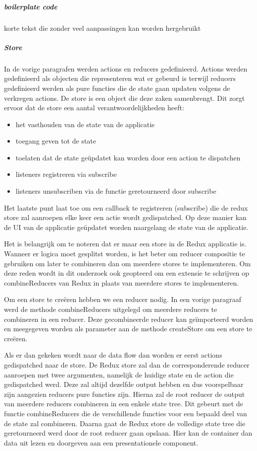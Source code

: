 \subparagraph{boilerplate code}
korte tekst die zonder veel aanpassingen kan worden hergebruikt

\subparagraph{Store}
In de vorige paragrafen werden actions en reducers gedefinieerd. Actions werden gedefinieerd als objecten die representeren wat er gebeurd is terwijl reducers gedefinieerd werden als pure functies die de state gaan updaten volgens de verkregen actions. De store is een object die deze zaken samenbrengt. Dit zorgt ervoor dat de store een aantal verantwoordelijkheden heeft:

\begin{itemize}
	\item het vasthouden van de state van de applicatie
	\item toegang geven tot de state
	\item toelaten dat de state geüpdatet kan worden door een action te dispatchen
	\item listeners registreren via subscribe
	\item listeners unsubscriben via de functie geretourneerd door subscribe
\end{itemize}

Het laatste punt laat toe om een callback te registreren (subscribe) die de redux store zal aanroepen elke keer een actie wordt gedispatched. Op deze manier kan de UI van de applicatie geüpdatet worden naargelang de state van de applicatie. 

Het is belangrijk om te noteren dat er maar een store in de Redux applicatie is. Wanneer er logica moet gesplitst worden, is het beter om reducer compositie te gebruiken om later te combineren dan om meerdere stores te implementeren. Om deze reden wordt in dit onderzoek ook geopteerd om een extensie te schrijven op combineReducers van Redux in plaats van meerdere stores te implementeren.

Om een store te creëren hebben we een reducer nodig. In een vorige paragraaf werd de methode combineReducers uitgelegd om meerdere reducers te combineren in een reducer. Deze gecombineerde reducer kan geïmporteerd worden en meegegeven worden als parameter aan de methode createStore om een store te creëren.

Als er dan gekeken wordt naar de data flow dan worden er eerst actions gedispatched naar de store. De Redux store zal dan de corresponderende reducer aanroepen met twee argumenten, namelijk de huidige state en de action die gedispatched werd. Deze zal altijd dezelfde output hebben en dus voorspelbaar zijn aangezien reducers pure functies zijn. Hierna zal de root reducer de output van meerdere reducers combineren in een enkele state tree. Dit gebeurt met de functie combineReducers die de verschillende functies voor een bepaald deel van de state zal combineren. Daarna gaat de Redux store de volledige state tree die geretourneerd werd door de root reducer gaan opslaan. Hier kan de container dan data uit lezen en doorgeven aan een presentationele component.
\autocite{Redux02}

